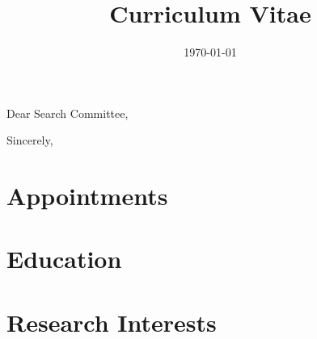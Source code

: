 \documentclass[11pt,letterpaper,roman]{moderncv} %
\title{Curriculum Vitae}
\newcounter{section} \setcounter{section}{1} \newtheorem{theorem}{Theorem}
\begin{document}

\date{\today}
\opening{Dear Search Committee,}
\closing{Sincerely,}
% 



\makecvtitle %


\section{Appointments}

\newcommand{\appointment}[6]{\cventry{#5}{#1}{#2}{#6}{}{}}


\section{Education}

\newcommand{\education}[8]{\cventry{#5}{#1}{#2}{#6}{}{#8}}


\section{Research Interests}


\nocite{he2026,bedrossian2026,martinez2026,yang2026,coiculescu2026,cao2026,yang2025,zhang2025,vasseur2024,zhang2024,vasseur2023,yang2022,vasseur2021,lin2020,yang2018}


\end{document}

